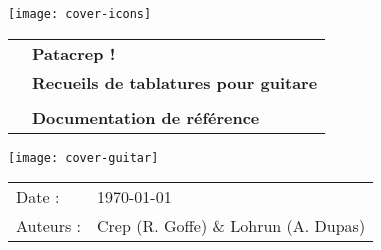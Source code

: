 \begin{titlepage}

  \texttt{[image: cover-icons]}
  \vspace{2cm}

  \begin{tabular}{l l}
    \hspace{2cm} & \textbf{\Huge Patacrep !}\\
    & \textbf{\huge Recueils de tablatures pour guitare}\\
    & \\
    & \textbf{\Large Documentation de référence}\\
  \end{tabular}

  \hspace{-2cm}\texttt{[image: cover-guitar]}

  \begin{flushright}
    \begin{tabular}{l l}
      Date : & \today \\
      Auteurs : &  Crep (R. Goffe) \& Lohrun (A. Dupas) \\
    \end{tabular}
  \end{flushright}

\end{titlepage}
